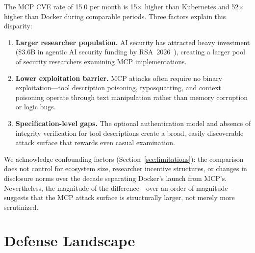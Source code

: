 \documentclass[11pt,twocolumn]{article}
\begin{document}

The MCP CVE rate of 15.0 per month is 15$\times$ higher than Kubernetes and 52$\times$ higher than Docker during comparable periods. Three factors explain this disparity:

\begin{enumerate}[leftmargin=*]
    \item \textbf{Larger researcher population.} AI security has attracted heavy investment (\$3.6B in agentic AI security funding by RSA~2026~\cite{rsa-2026}), creating a larger pool of security researchers examining MCP implementations.
    \item \textbf{Lower exploitation barrier.} MCP attacks often require no binary exploitation---tool description poisoning, typosquatting, and context poisoning operate through text manipulation rather than memory corruption or logic bugs.
    \item \textbf{Specification-level gaps.} The optional authentication model and absence of integrity verification for tool descriptions create a broad, easily discoverable attack surface that rewards even casual examination.
\end{enumerate}

We acknowledge confounding factors (Section~\ref{sec:limitations}): the comparison does not control for ecosystem size, researcher incentive structures, or changes in disclosure norms over the decade separating Docker's launch from MCP's. Nevertheless, the magnitude of the difference---over an order of magnitude---suggests that the MCP attack surface is structurally larger, not merely more scrutinized.

\section{Defense Landscape}
\label{sec:defense}
\end{document}
